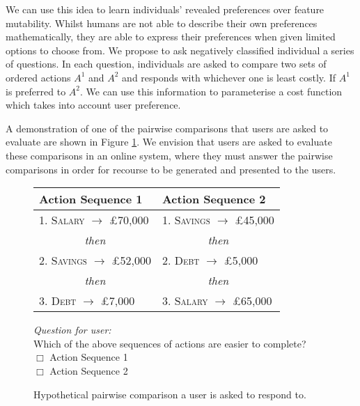 We can use this idea to learn individuals' revealed preferences over feature mutability. Whilst humans are not able to describe their own preferences mathematically, they are able to express their preferences when given limited options to choose from. We propose to ask negatively classified individual a series of questions. In each question, individuals are asked to compare two sets of ordered actions $A^1$ and $A^2$ and responds with whichever one is least costly. If $A^1$ is preferred to $A^2$. We can use this information to parameterise a cost function which takes into account user preference.

A demonstration of one of the pairwise comparisons that users are asked to evaluate are shown in Figure \ref{fig:comparison_ui}. We envision that users are asked to evaluate these comparisons in an online system, where they must answer the pairwise comparisons in order for recourse to be generated and presented to the users.

\begin{figure}[!htb]
	\centering
	\begin{tabular}{l|l}
		\hline
		\textbf{Action Sequence 1} & \textbf{Action Sequence 2} \\
		\hline
		\textsc{1. Salary} $\to$ £70,000 & \textsc{1. Savings} $\to$ £45,000 \\
		\multicolumn{1}{c|}{\textit{then}} & \multicolumn{1}{c}{\textit{then}}\\
		\textsc{2. Savings} $\to$ £52,000 & \textsc{2. Debt} $\to$ £5,000 \\
		\multicolumn{1}{c|}{\textit{then}} & \multicolumn{1}{c}{\textit{then}}\\
		\textsc{3. Debt} $\to$ £7,000 & \textsc{3. Salary} $\to$ £65,000 \\ 
		\hline
	\end{tabular}
	
	\vspace{1.5em} %
	\parbox{\linewidth}{
		\centering
		\textit{Question for user:}\\
		Which of the above sequences of actions are easier to complete? \\
		$\Box$ Action Sequence 1 \\
		$\Box$ Action Sequence 2
	}
	
	\caption{Hypothetical pairwise comparison a user is asked to respond to.}
	\label{fig:comparison_ui}
\end{figure}

